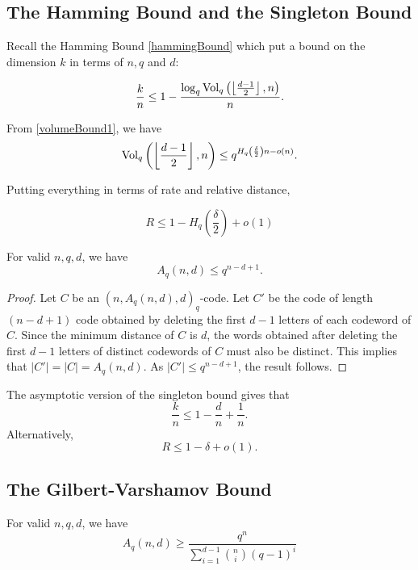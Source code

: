 \subsection{The Hamming Bound and the Singleton Bound}

Recall the Hamming Bound \ref{hammingBound} which put a bound on the dimension $k$ in terms of $n,q$ and $d$:

$$\frac{k}{n}\leq 1 - \frac{\log_q\operatorname{Vol}_q\left(\left\lfloor\frac{d-1}{2}\right\rfloor, n\right)}{n}.$$

From \ref{volumeBound1}, we have
$$\operatorname{Vol}_q\left(\left\lfloor\frac{d-1}{2}\right\rfloor, n\right) \leq q^{H_q\left(\frac{\delta}{2}\right)n-o(n)}.$$

Putting everything in terms of rate and relative distance,

$$R\leq 1-H_q\left(\frac{\delta}{2}\right)+o(1)$$

\begin{theorem}
    For valid $n,q,d$, we have
    $$A_q(n,d)\leq q^{n-d+1}.$$
\end{theorem}
\begin{proof}
    Let $C$ be an $(n,A_q(n,d),d)_q$-code. Let $C'$ be the code of length $(n-d+1)$ code obtained by deleting the first $d-1$ letters of each codeword of $C$. Since the minimum distance of $C$ is $d$, the words obtained after deleting the first $d-1$ letters of distinct codewords of $C$ must also be distinct. This implies that $|C'| =|C| =A_q(n,d)$. As $| C'| \leq q^{n-d+1}$, the result follows.
\end{proof}

The asymptotic version of the singleton bound gives that
$$\frac{k}{n}\leq 1-\frac{d}{n}+\frac{1}{n}.$$
Alternatively,
$$R\leq 1-\delta+o(1).$$

\subsection{The Gilbert-Varshamov Bound}

\begin{theorem}
    For valid $n,q,d$, we have
    $$A_q(n,d)\geq \frac{q^n}{\sum_{i=1}^{d-1}\binom{n}{i}(q-1)^i}$$
\end{theorem}

